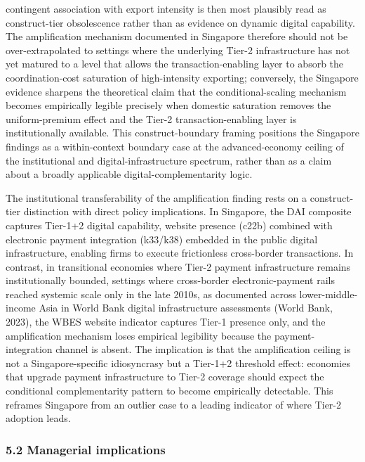\documentclass[12pt,a4paper]{article}
\begin{document}
contingent association with export intensity is then most plausibly read
as construct-tier obsolescence rather than as evidence on dynamic
digital capability. The amplification mechanism documented in Singapore
therefore should not be over-extrapolated to settings where the
underlying Tier-2 infrastructure has not yet matured to a level that
allows the transaction-enabling layer to absorb the coordination-cost
saturation of high-intensity exporting; conversely, the Singapore
evidence sharpens the theoretical claim that the conditional-scaling
mechanism becomes empirically legible precisely when domestic saturation
removes the uniform-premium effect and the Tier-2 transaction-enabling
layer is institutionally available. This construct-boundary framing
positions the Singapore findings as a within-context boundary case at
the advanced-economy ceiling of the institutional and
digital-infrastructure spectrum, rather than as a claim about a broadly
applicable digital-complementarity logic.

The institutional transferability of the amplification finding rests on
a construct-tier distinction with direct policy implications. In
Singapore, the DAI composite captures Tier-1+2 digital capability,
website presence (c22b) combined with electronic payment integration
(k33/k38) embedded in the public digital infrastructure, enabling firms
to execute frictionless cross-border transactions. In contrast, in
transitional economies where Tier-2 payment infrastructure remains
institutionally bounded, settings where cross-border electronic-payment
rails reached systemic scale only in the late 2010s, as documented
across lower-middle-income Asia in World Bank digital infrastructure
assessments (World Bank, 2023), the WBES website indicator captures
Tier-1 presence only, and the amplification mechanism loses empirical
legibility because the payment-integration channel is absent. The
implication is that the amplification ceiling is not a
Singapore-specific idiosyncrasy but a Tier-1+2 threshold effect:
economies that upgrade payment infrastructure to Tier-2 coverage should
expect the conditional complementarity pattern to become empirically
detectable. This reframes Singapore from an outlier case to a leading
indicator of where Tier-2 adoption leads.

\hypertarget{52-managerial-implications}{%
\subsubsection{5.2 Managerial
implications}\label{52-managerial-implications}}
\end{document}
